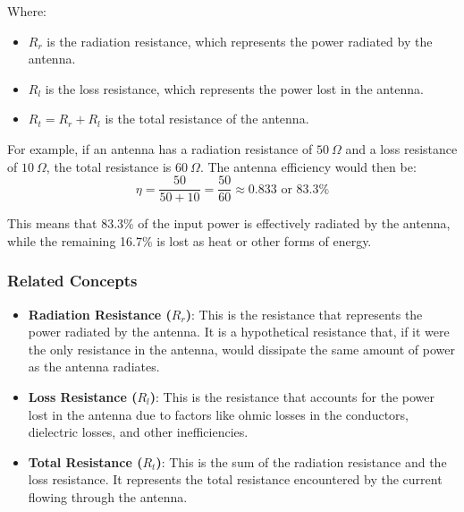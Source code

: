 Where:
\begin{itemize}
    \item \(R_r\) is the radiation resistance, which represents the power radiated by the antenna.
    \item \(R_l\) is the loss resistance, which represents the power lost in the antenna.
    \item \(R_t = R_r + R_l\) is the total resistance of the antenna.
\end{itemize}

For example, if an antenna has a radiation resistance of \(50\ \Omega\) and a loss resistance of \(10\ \Omega\), the total resistance is \(60\ \Omega\). The antenna efficiency would then be:
\[
\eta = \frac{50}{50 + 10} = \frac{50}{60} \approx 0.833 \text{ or } 83.3\%
\]

This means that 83.3\% of the input power is effectively radiated by the antenna, while the remaining 16.7\% is lost as heat or other forms of energy.

\subsubsection{Related Concepts}
\begin{itemize}
    \item \textbf{Radiation Resistance (\(R_r\))}: This is the resistance that represents the power radiated by the antenna. It is a hypothetical resistance that, if it were the only resistance in the antenna, would dissipate the same amount of power as the antenna radiates.
    \item \textbf{Loss Resistance (\(R_l\))}: This is the resistance that accounts for the power lost in the antenna due to factors like ohmic losses in the conductors, dielectric losses, and other inefficiencies.
    \item \textbf{Total Resistance (\(R_t\))}: This is the sum of the radiation resistance and the loss resistance. It represents the total resistance encountered by the current flowing through the antenna.
\end{itemize}

